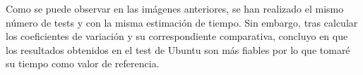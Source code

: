 Como se puede observar en las imágenes anteriores, se han realizado el mismo número de tests y con la misma estimación de tiempo. Sin embargo, tras calcular los 
coeficientes de variación y su correspondiente comparativa, concluyo en que los resultados obtenidos en el test de Ubuntu son más fiables por lo que tomaré su
tiempo como valor de referencia.

\begin{thebibliography}{0}
    \bibitem{} \href{}{}
\end{thebibliography}


